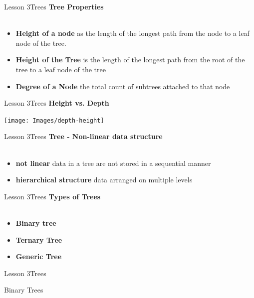 \documentclass[aspectratio=1610]{beamer}
\begin{document}
\begin{frame}{Lesson 3}{Trees}
\LARGE
\textbf{Tree Properties}\\~\\
\Large
\begin{itemize}
	\item \textbf{Height of a node} as the length of the longest path from the node to a leaf node of the tree.
	\item \textbf{Height of the Tree} is the length of the longest path from the root of the tree to a leaf node of the tree
	\item \textbf{Degree of a Node} the total count of subtrees attached to that node
\end{itemize}
\end{frame}



\begin{frame}{Lesson 3}{Trees}
\LARGE
\textbf{Height vs. Depth}
\begin{center}
\texttt{[image: Images/depth-height]}
\end{center}
\end{frame}


\begin{frame}{Lesson 3}{Trees}
\LARGE
\textbf{Tree - Non-linear data structure}\\~\\
\begin{itemize}
	\item \textbf{not linear} data in a tree are not stored in a sequential manner
	\item \textbf{hierarchical structure} data arranged on multiple levels
\end{itemize}
\end{frame}


\begin{frame}{Lesson 3}{Trees}
\LARGE
\textbf{Types of Trees}\\~\\
\begin{itemize}
	\item \textbf{Binary tree}
	\item \textbf{Ternary Tree}
	\item \textbf{Generic Tree}
\end{itemize}
\end{frame}

\begin{frame}{Lesson 3}{Trees}
\begin{center}
\huge Binary Trees
\end{center}
\end{frame}
\end{document}
